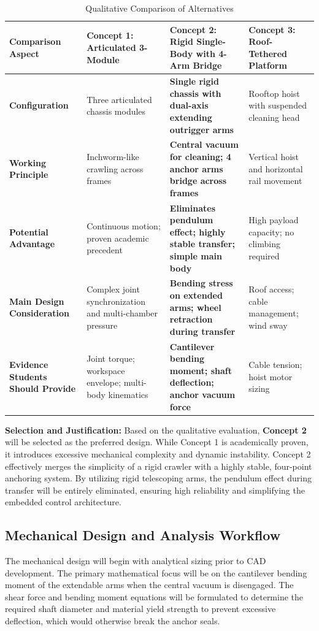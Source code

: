 \documentclass[12pt, a4paper]{article}
\begin{document}
\begin{table}[H]
\centering
\caption{Qualitative Comparison of Alternatives}
\renewcommand{\arraystretch}{1.4}
\begin{tabular}{|>{\raggedright\arraybackslash}p{2.9cm}|>{\raggedright\arraybackslash}p{3.7cm}|>{\raggedright\arraybackslash}p{4.2cm}|>{\raggedright\arraybackslash}p{3.4cm}|}
\hline
\textbf{Comparison Aspect} & \textbf{Concept 1: Articulated 3-Module} & \textbf{Concept 2: Rigid Single-Body with 4-Arm Bridge} & \textbf{Concept 3: Roof-Tethered Platform} \\ \hline
\textbf{Configuration} & Three articulated chassis modules & \textbf{Single rigid chassis with dual-axis extending outrigger arms} & Rooftop hoist with suspended cleaning head \\ \hline
\textbf{Working Principle} & Inchworm-like crawling across frames & \textbf{Central vacuum for cleaning; 4 anchor arms bridge across frames} & Vertical hoist and horizontal rail movement \\ \hline
\textbf{Potential Advantage} & Continuous motion; proven academic precedent & \textbf{Eliminates pendulum effect; highly stable transfer; simple main body} & High payload capacity; no climbing required \\ \hline
\textbf{Main Design Consideration} & Complex joint synchronization and multi-chamber pressure & \textbf{Bending stress on extended arms; wheel retraction during transfer} & Roof access; cable management; wind sway \\ \hline
\textbf{Evidence Students Should Provide} & Joint torque; workspace envelope; multi-body kinematics & \textbf{Cantilever bending moment; shaft deflection; anchor vacuum force} & Cable tension; hoist motor sizing \\ \hline
\end{tabular}
\end{table}

\textbf{Selection and Justification:} 
Based on the qualitative evaluation, \textbf{Concept 2} will be selected as the preferred design. While Concept 1 is academically proven, it introduces excessive mechanical complexity and dynamic instability. Concept 2 effectively merges the simplicity of a rigid crawler with a highly stable, four-point anchoring system. By utilizing rigid telescoping arms, the pendulum effect during transfer will be entirely eliminated, ensuring high reliability and simplifying the embedded control architecture.

\subsection{Mechanical Design and Analysis Workflow}
The mechanical design will begin with analytical sizing prior to CAD development. The primary mathematical focus will be on the cantilever bending moment of the extendable arms when the central vacuum is disengaged. The shear force and bending moment equations will be formulated to determine the required shaft diameter and material yield strength to prevent excessive deflection, which would otherwise break the anchor seals.
\end{document}
